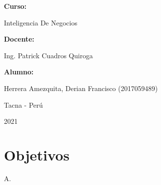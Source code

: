 \documentclass[12pt,letterpaper]{article}
\begin{document}
\begin{titlepage}
\begin{center}
\vspace*{0.3in}
\begin{Large}
\textbf{Curso:} \\
\end{Large}

\vspace*{0.1in}
\begin{large}
    Inteligencia De Negocios\\
\end{large}

\vspace*{0.3in}
\begin{Large}
\textbf{Docente:} \\
\end{Large}

\vspace*{0.1in}
\begin{large}
Ing. Patrick Cuadros Quiroga\\
\end{large}

\vspace*{0.2in}
\vspace*{0.1in}
\begin{large}
\textbf{Alumno:} \\
\begin{flushleft}
 Herrera Amezquita, Derian Francisco		\hfill	(2017059489) \\


\end{flushleft}
\end{large}
\vspace*{0.1in}
\begin{large}
Tacna - Perú\\
\end{large}
\vspace*{0.1in}
\begin{large}
2021\\
\end{large}

\end{center}

\end{titlepage}



\tableofcontents %
\thispagestyle{empty} %
\newpage
\setcounter{page}{1} %


\section{Objetivos}
A.
\end{document}
